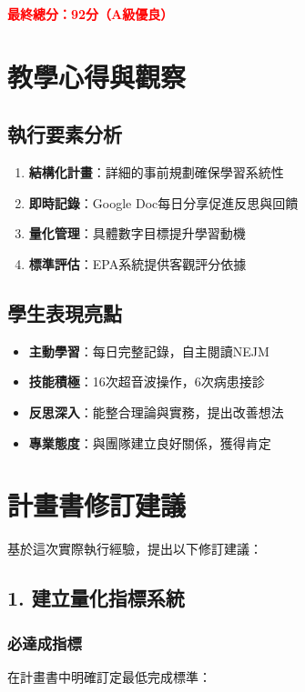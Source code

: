 \documentclass[12pt,a4paper]{article}
\begin{document}
\textcolor{red}{\Large \textbf{最終總分：92分（A級優良）}}

\section{教學心得與觀察}

\subsection{執行要素分析}

\begin{enumerate}
\item \textbf{結構化計畫}：詳細的事前規劃確保學習系統性
\item \textbf{即時記錄}：Google Doc每日分享促進反思與回饋
\item \textbf{量化管理}：具體數字目標提升學習動機
\item \textbf{標準評估}：EPA系統提供客觀評分依據
\end{enumerate}

\subsection{學生表現亮點}

\begin{itemize}
\item \textbf{主動學習}：每日完整記錄，自主閱讀NEJM
\item \textbf{技能積極}：16次超音波操作，6次病患接診
\item \textbf{反思深入}：能整合理論與實務，提出改善想法
\item \textbf{專業態度}：與團隊建立良好關係，獲得肯定
\end{itemize}

\section{計畫書修訂建議}

基於這次實際執行經驗，提出以下修訂建議：

\subsection{1. 建立量化指標系統}

\subsubsection{必達成指標}
在計畫書中明確訂定最低完成標準：
\end{document}
